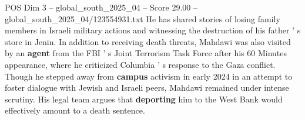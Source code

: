 \begin{textsample}{POS Dim 3 – global\_south\_2025\_04 – Score 29.00 – global\_south\_2025\_04/123554931.txt}
He has shared stories of losing family members in Israeli military actions and witnessing the destruction of his father ' s store in Jenin.
In addition to receiving death threats, Mahdawi was also visited by an \textbf{agent} from the FBI ' s Joint Terrorism Task Force after his 60 Minutes appearance, where he criticized Columbia ' s response to the Gaza conflict.
Though he stepped away from \textbf{campus} activism in early 2024 in an attempt to foster dialogue with Jewish and Israeli peers, Mahdawi remained under intense scrutiny.
His legal team argues that \textbf{deporting} him to the West Bank would effectively amount to a death sentence.

\end{textsample}
